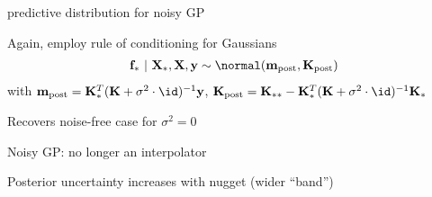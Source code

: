 \documentclass[11pt,compress,t,notes=noshow, xcolor=table]{beamer}
\begin{document}
\begin{framei}[sep=M]{predictive distribution for noisy GP}
\item Again, employ rule of conditioning for Gaussians 
\begin{eqnarray*}
\fv_* ~|~ \Xmat_*, \Xmat, \yv \sim \normal(\mv_{\text{post}}, \Kmat_\text{post})
\end{eqnarray*}
with 
$\mv_{\text{post}} = \Kmat_{*}^{T} (\Kmat+ \sigma^2 \cdot \id)^{-1}\yv$, 
$\Kmat_\text{post} = \Kmat_{**} - \Kmat_*^T (\Kmat  + \sigma^2 \cdot \id)^{-1}\Kmat_*$
\item Recovers noise-free case for $\sigma^2 = 0$
\item Noisy GP: no longer an interpolator 
\item Posterior uncertainty increases with nugget (wider ``band'')
\vfill
{}
\end{framei}



  
\end{document}
